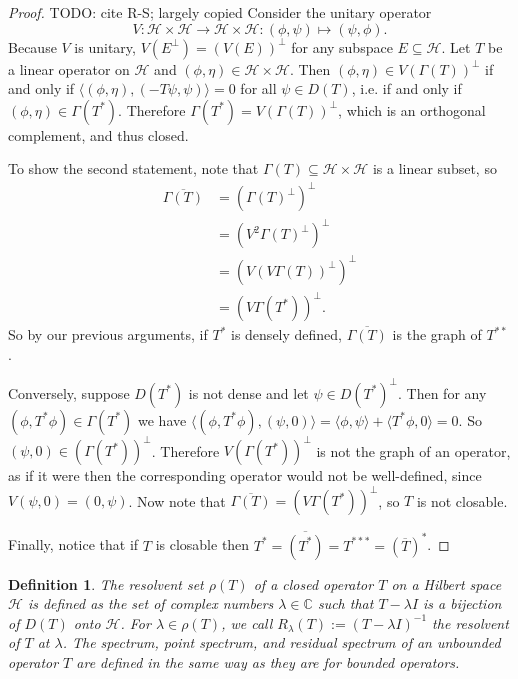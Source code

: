 \documentclass[12pt,oneside]{report}
\newtheorem{defn}[thm]{Definition}
\begin{document}
\begin{proof}
    TODO: cite R-S; largely copied Consider the unitary operator $$V: \mathscr{H} \times \mathscr{H} \to \mathscr{H} \times \mathscr{H}: (\phi,\psi) \mapsto (\psi,\phi).$$Because $V$ is unitary, $V(E^{\perp}) = (V(E))^{\perp}$ for any subspace $E \subseteq \mathscr{H}$. Let $T$ be a linear operator on $\mathscr{H}$ and $(\phi, \eta) \in \mathscr{H} \times \mathscr{H}$. Then $(\phi, \eta) \in V(\Gamma(T))^{\perp}$ if and only if $\langle (\phi,\eta), (-T\psi,\psi) \rangle = 0$ for all $\psi \in D(T)$, i.e. if and only if $(\phi, \eta) \in \Gamma(T^{*})$. Therefore $\Gamma(T^{*}) = V(\Gamma(T))^{\perp}$, which is an orthogonal complement, and thus closed.

    To show the second statement, note that $\Gamma(T) \subseteq \mathscr{H} \times \mathscr{H}$ is a linear subset, so
    \begin{align}
        \overline{\Gamma(T)} &= (\Gamma(T)^{\perp})^{\perp} \\
        &= (V^{2}\Gamma(T)^{\perp})^{\perp} \\
        &= (V(V\Gamma(T))^{\perp})^{\perp} \\
        &= (V\Gamma(T^{*}))^{\perp}.
    \end{align}
    So by our previous arguments, if $T^{*}$ is densely defined, $\overline{\Gamma(T)}$ is the graph of $T^{**}$.

    Conversely, suppose $D(T^{*})$ is not dense and let $\psi \in D(T^{*})^{\perp}$. 
    Then for any $(\phi, T^{*}\phi) \in \Gamma(T^{*})$ we have $\langle (\phi, T^{*}\phi), (\psi,0) \rangle = \langle \phi, \psi \rangle + \langle T^{*}\phi, 0 \rangle = 0$. So $(\psi, 0) \in (\Gamma(T^{*}))^{\perp}$.
    Therefore $V(\Gamma(T^{*}))^{\perp}$ is not the graph of an operator, as if it were then the corresponding operator would not be well-defined, since $V(\psi, 0) = (0, \psi)$. Now note that $\overline{\Gamma(T)} = (V\Gamma(T^{*}))^{\perp}$, so $T$ is not closable.

    Finally, notice that if $T$ is closable then $T^{*} = \overline{(T^{*})} = T^{***} = (\overline{T})^{*}$.
\end{proof}

\begin{defn}
    The resolvent set $\rho(T)$ of a closed operator $T$ on a Hilbert space $\mathscr{H}$ is defined as the set of complex numbers $\lambda \in \mathbb{C}$ such that $T - \lambda I$ is a bijection of $D(T)$ onto $\mathscr{H}$. For $\lambda \in \rho(T)$, we call $R_\lambda (T) := (T - \lambda I)^{-1}$ the resolvent of $T$ at $\lambda$. The spectrum, point spectrum, and residual spectrum of an unbounded operator $T$ are defined in the same way as they are for bounded operators.
\end{defn}
\end{document}
